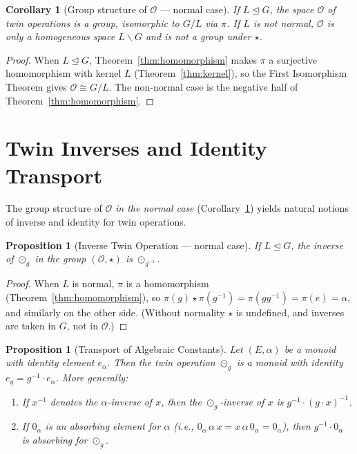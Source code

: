 \documentclass[11pt,a4paper,openany]{book}
\theoremstyle{plain}
\newtheorem{proposition}[theorem]{Proposition}
\newtheorem{corollary}[theorem]{Corollary}
\theoremstyle{definition}
\newcommand{\twing}[1]{\odot_{#1}}
\newcommand{\opspace}{\mathcal{O}}
\newcommand{\lingroup}{L}
\newcommand{\actspace}{E}
\newcommand{\groupG}{G}
\begin{document}
\begin{corollary}[Group structure of $\opspace$ --- normal case]\label{cor:group-structure}
If $\lingroup \trianglelefteq \groupG$, the space $\opspace$ of twin operations is a group, isomorphic to $\groupG/\lingroup$ via $\pi$. If $\lingroup$ is not normal, $\opspace$ is only a homogeneous space $\lingroup\backslash\groupG$ and is not a group under $\star$.
\end{corollary}

\begin{proof}
When $\lingroup\trianglelefteq\groupG$, Theorem~\ref{thm:homomorphism} makes $\pi$ a surjective homomorphism with kernel $\lingroup$ (Theorem~\ref{thm:kernel}), so the First Isomorphism Theorem gives $\opspace\cong\groupG/\lingroup$. The non-normal case is the negative half of Theorem~\ref{thm:homomorphism}.
\end{proof}

\section{Twin Inverses and Identity Transport}

The group structure of $\opspace$ \emph{in the normal case} (Corollary~\ref{cor:group-structure}) yields natural notions of inverse and identity for twin operations.

\begin{proposition}[Inverse Twin Operation --- normal case]\label{prop:inverse-twin}
If $\lingroup \trianglelefteq \groupG$, the inverse of $\twing{g}$ in the group $(\opspace, \star)$ is $\twing{g^{-1}}$.
\end{proposition}

\begin{proof}
When $\lingroup$ is normal, $\pi$ is a homomorphism (Theorem~\ref{thm:homomorphism}), so $\pi(g) \star \pi(g^{-1}) = \pi(gg^{-1}) = \pi(e) = \alpha$, and similarly on the other side. (Without normality $\star$ is undefined, and inverses are taken in $\groupG$, not in $\opspace$.)
\end{proof}

\begin{proposition}[Transport of Algebraic Constants]\label{prop:transport-constants}
Let $(\actspace, \alpha)$ be a monoid with identity element $e_\alpha$. Then the twin operation $\twing{g}$ is a monoid with identity $e_g = g^{-1} \cdot e_\alpha$. More generally:
\begin{enumerate}
    \item If $x^{-1}$ denotes the $\alpha$-inverse of $x$, then the $\twing{g}$-inverse of $x$ is $g^{-1} \cdot (g \cdot x)^{-1}$.
    \item If $0_\alpha$ is an absorbing element for $\alpha$ (i.e., $0_\alpha \,\alpha\, x = x \,\alpha\, 0_\alpha = 0_\alpha$), then $g^{-1} \cdot 0_\alpha$ is absorbing for $\twing{g}$.
\end{enumerate}
\end{proposition}
\end{document}
